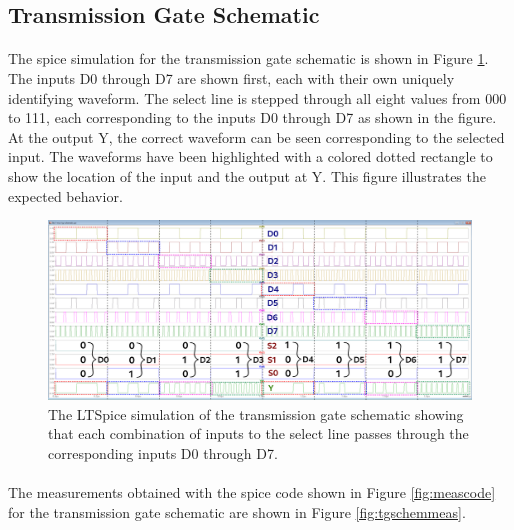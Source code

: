 \documentclass{article}
\begin{document}
  \subsection{Transmission Gate Schematic}
    \paragraph{}
    The spice simulation for the transmission gate schematic is shown in Figure \ref{fig:tgspice}. The inputs D0 through D7 are shown first, each with their own uniquely identifying waveform. The select line is stepped through all eight values from 000 to 111, each corresponding to the inputs D0 through D7 as shown in the figure. At the output Y, the correct waveform can be seen corresponding to the selected input. The waveforms have been highlighted with a colored dotted rectangle to show the location of the input and the output at Y. This figure illustrates the expected behavior.

    \begin{figure}[H]
      \centering
      \includegraphics[width=\linewidth, frame]{screenshots/tg/schem/spice.png}
      \caption{The LTSpice simulation of the transmission gate schematic showing that each combination of inputs to the select line passes through the corresponding inputs D0 through D7.}
      \label{fig:tgspice}
    \end{figure}

    \paragraph{}
    The measurements obtained with the spice code shown in Figure \ref{fig:meascode} for the transmission gate schematic are shown in Figure \ref{fig:tgschemmeas}.
\end{document}
